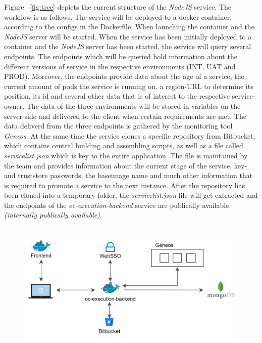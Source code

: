 \documentclass[a4paper,twoside,11pt, pagesize]{scrartcl}
\begin{document}
\begin{spacing}{1.2}
Figure ~\ref{fig:tree} depicts the current structure of the \textit{NodeJS} service. The workflow is as follows. The service will be deployed to a docker container, according to the configs in the Dockerfile. When launching the container and the \textit{NodeJS} server will be started. When the service has been initially deployed to a container and the \textit{NodeJS} server has been started, the service will query several endpoints. The endpoints which will be queried hold information about the different versions of service in the respective environments (INT, UAT and PROD). Moreover, the endpoints provide data about the age of a service, the current amount of pods the service is running on, a region-URL to determine its position, its id and several other data that is of interest to the respective service-owner. The data of the three environments will be stored in variables on the server-side and delivered to the client when certain requirements are met. The data deliverd from the three endpoints is gathered by the monitoring tool \textit{Geneos}. At the same time the service clones a specific repository from Bitbucket, which contains central building and assembling scripts, as well as a file called \textit{servicelist.json} which is key to the entire application. The file is maintained by the team and provides information about the current stage of the service, key- and truststore passwords, the baseimage name and much other information that is required to promote a service to the next instance. After the repository has been cloned into a temporary folder, the \textit{servicelist.json} file will get extracted and the endpoints of the \textit{oc-execution-backend} service are publically available \textit{(internally publically available)}.\\\\ 
\begin{figure}[H]
\label{fig:oc}
\centering
\includegraphics[width=1\textwidth]{oc.jpg}

\end{figure}
\end{spacing}
\end{document}
